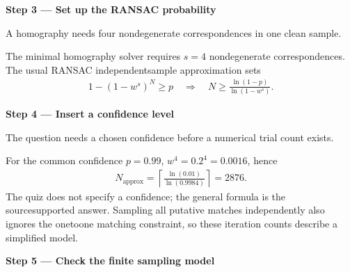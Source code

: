 \documentclass[letterpaper,11pt,english,openany,oneside]{jupyterBook}
\begin{document}
\par

\par\medskip{}
{\color{QuizStepRed}\bfseries Step 3 — Set up the RANSAC probability}\par\smallskip

\sphinxAtStartPar
{} A homography needs four nondegenerate correspondences in one clean sample.

\sphinxAtStartPar
The minimal homography solver requires {\color{QuizMathBlue} \(s=4\)} nondegenerate correspondences. The usual RANSAC independent\sphinxhyphen{}sample approximation sets
{\color{QuizMathBlue} \begin{equation*}
\begin{split}
1-(1-w^s)^N\ge p\quad\Rightarrow\quad N\ge\frac{\ln(1-p)}{\ln(1-w^s)}.
\end{split}
\end{equation*}}
\par

\par\medskip{}
{\color{QuizStepRed}\bfseries Step 4 — Insert a confidence level}\par\smallskip

\sphinxAtStartPar
{} The question needs a chosen confidence before a numerical trial count exists.

\sphinxAtStartPar
For the  common confidence {\color{QuizMathBlue} \(p=0.99\)}, {\color{QuizMathBlue} \(w^4=0.2^4=0.0016\)}, hence
{\color{QuizMathBlue} \begin{equation*}
\begin{split}
\boxed{N_{\mathrm{approx}}=\left\lceil\frac{\ln(0.01)}{\ln(0.9984)}\right\rceil=2876}.
\end{split}
\end{equation*}}
\sphinxAtStartPar
The quiz does not specify a confidence; the general formula is the source\sphinxhyphen{}supported answer. Sampling all putative matches independently also ignores the one\sphinxhyphen{}to\sphinxhyphen{}one matching constraint, so these iteration counts describe a simplified model.

\par

\par\medskip{}
{\color{QuizStepRed}\bfseries Step 5 — Check the finite sampling model}\par\smallskip
\end{document}
